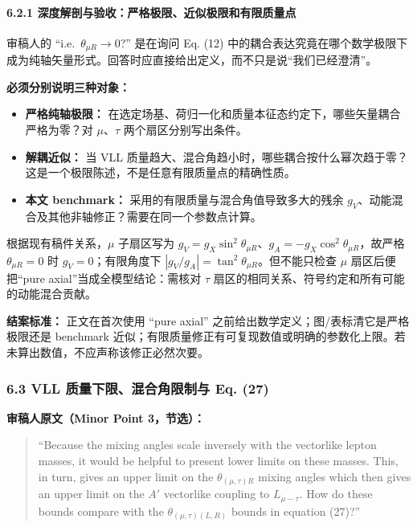 \documentclass[
  chinese,
  UTF8]{ctexart}
\providecommand{\tightlist}{%
  \setlength{\itemsep}{0pt}\setlength{\parskip}{0pt}}
\begin{document}
\paragraph{6.2.1
深度解剖与验收：严格极限、近似极限和有限质量点}\label{ux6df1ux5ea6ux89e3ux5256ux4e0eux9a8cux6536ux4e25ux683cux6781ux9650ux8fd1ux4f3cux6781ux9650ux548cux6709ux9650ux8d28ux91cfux70b9}

审稿人的 ``i.e.~\(\theta_{\mu R}\to0\)?'' 是在询问 Eq. (12)
中的耦合表达究竟在哪个数学极限下成为纯轴矢量形式。回答时应直接给出定义，而不只是说``我们已经澄清''。

\textbf{必须分别说明三种对象：}

\begin{itemize}
\tightlist
\item
  \textbf{严格纯轴极限：}
  在选定场基、荷归一化和质量本征态约定下，哪些矢量耦合严格为零？对
  \ensuremath{\mu}、\ensuremath{\tau} 两个扇区分别写出条件。
\item
  \textbf{解耦近似：} 当 VLL
  质量趋大、混合角趋小时，哪些耦合按什么幂次趋于零？这是一个极限陈述，不是任意有限质量点的精确性质。
\item
  \textbf{本文 benchmark：} 采用的有限质量与混合角值导致多大的残余
  \(g_V\)、动能混合及其他非轴修正？需要在同一个参数点计算。
\end{itemize}

根据现有稿件关系，\ensuremath{\mu} 子扇区写为
\(g_V=g_X\sin^2\theta_{\mu R}\)、\(g_A=-g_X\cos^2\theta_{\mu R}\)，故严格
\(\theta_{\mu R}=0\) 时 \(g_V=0\)；有限角度下
\(|g_V/g_A|=\tan^2\theta_{\mu R}\)。但不能只检查 \ensuremath{\mu}
扇区后便把``pure axial''当成全模型结论：需核对 \ensuremath{\tau}
扇区的相同关系、符号约定和所有可能的动能混合贡献。

\textbf{结案标准：} 正文在首次使用 ``pure axial''
之前给出数学定义；图/表标清它是严格极限还是 benchmark
近似；有限质量修正有可复现数值或明确的参数化上限。若未算出数值，不应声称该修正必然次要。

\subsubsection{6.3 VLL 质量下限、混合角限制与 Eq.
(27)}\label{vll-ux8d28ux91cfux4e0bux9650ux6df7ux5408ux89d2ux9650ux5236ux4e0e-eq.-27}

\textbf{审稿人原文（Minor Point 3，节选）：}

\begin{quote}
``Because the mixing angles scale inversely with the vectorlike lepton
masses, it would be helpful to present lower limits on these masses.
This, in turn, gives an upper limit on the \(\theta_{(\mu,\tau)R}\)
mixing angles which then gives an upper limit on the \(A'\) vectorlike
coupling to \(L_{\mu-\tau}\). How do these bounds compare with the
\(\theta_{(\mu,\tau)(L,R)}\) bounds in equation (27)?''
\end{quote}
\end{document}
